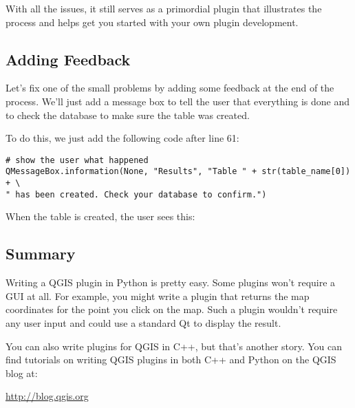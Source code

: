 With all the issues, it still serves as a primordial plugin that illustrates the process and helps get you started with your own plugin development.

\subsection{Adding Feedback}

Let's fix one of the small problems by adding some feedback at the end of the process.
We'll just add a message box to tell the user that everything is done and to check the database to make sure the table was created.

To do this, we just add the following code after line 61:

\begin{verbatim}
# show the user what happened
QMessageBox.information(None, "Results", "Table " + str(table_name[0]) + \
" has been created. Check your database to confirm.")
\end{verbatim}

When the table is created, the user sees this:


\subsection{Summary}
Writing a QGIS plugin in Python is pretty easy.
Some plugins won't require a GUI at all.
For example, you might write a plugin that returns the map coordinates for the point you click on the map.
Such a plugin wouldn't require any user input and could use a standard Qt \classname{QMessageBox} to display the result.

You can also write plugins for QGIS in C++, but that's another story.
You can find tutorials on writing QGIS plugins in both C++ and Python on the QGIS blog at:

\begin{center}
  \url{http://blog.qgis.org} 
\end{center}